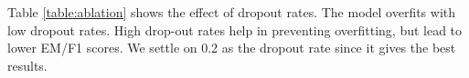 Table \ref{table:ablation} shows the effect of dropout rates. The model overfits with low dropout rates.  High drop-out rates help in preventing overfitting, but lead to lower EM/F1 scores. We settle on 0.2 as the dropout rate since it gives the best results.


%
